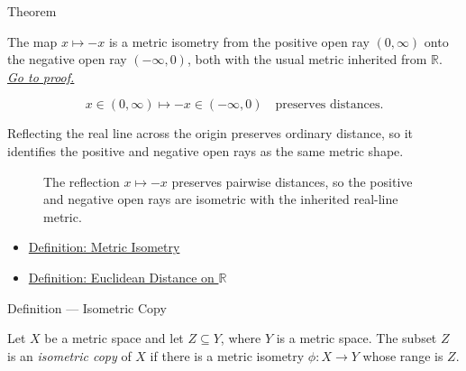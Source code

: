 \begin{theorembox}{Theorem}
\begin{theorem}
\label{thm:positive-negative-open-rays-isometric}
The map \(x\mapsto -x\) is a metric isometry from the positive open ray
\((0,\infty)\) onto the negative open ray \((-\infty,0)\), both with the
usual metric inherited from \(\mathbb{R}\).
\hyperref[prf:positive-negative-open-rays-isometric]{\textit{Go to proof.}}
\end{theorem}
\end{theorembox}

\begin{remark*}
\[
x\in(0,\infty)
\mapsto
-x\in(-\infty,0)
\quad\text{preserves distances.}
\]
\end{remark*}

\begin{remark*}[Interpretation]
Reflecting the real line across the origin preserves ordinary distance, so it
identifies the positive and negative open rays as the same metric shape.
\end{remark*}

\begin{figure}[htbp]
\centering

\caption{The reflection \(x\mapsto -x\) preserves pairwise distances, so the
positive and negative open rays are isometric with the inherited real-line
metric.}
\label{fig:positive-negative-rays-isometry}
\end{figure}


\begin{dependencies}
\begin{itemize}
  \item \hyperref[def:metric-isometry]{Definition: Metric Isometry}
  \item \hyperref[def:real-line-euclidean-distance]{Definition: Euclidean Distance on \(\mathbb{R}\)}
\end{itemize}
\end{dependencies}

\begin{definitionbox}{Definition --- Isometric Copy}
\begin{definition}\label{def:isometric-copy}
Let \(X\) be a metric space and let \(Z\subseteq Y\), where \(Y\) is a metric
space.  The subset \(Z\) is an \emph{isometric copy} of \(X\) if there is a
metric isometry \(\phi:X\to Y\) whose range is \(Z\).
\end{definition}
\end{definitionbox}


